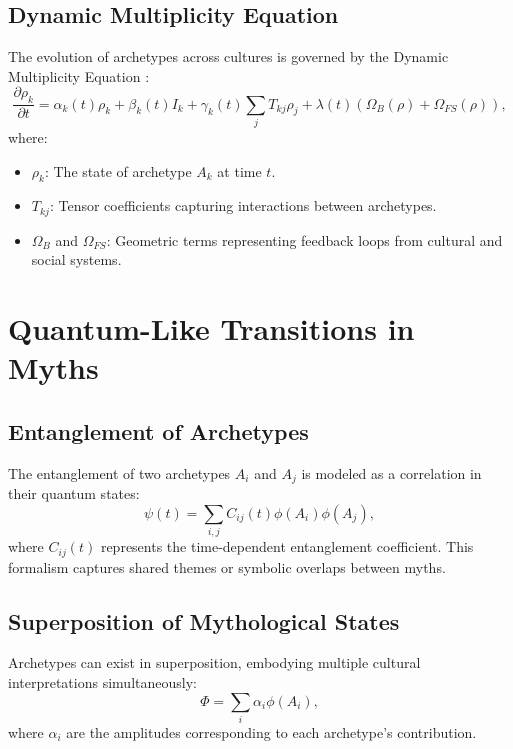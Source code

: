 \documentclass{article}
\theoremstyle{plain}
\begin{document}
\subsection{Dynamic Multiplicity Equation}
The evolution of archetypes across cultures is governed by the Dynamic Multiplicity Equation \cite{galioto2024dynamic}:
\begin{equation}
\frac{\partial \rho_k}{\partial t} = \alpha_k(t)\rho_k + \beta_k(t)I_k + \gamma_k(t) \sum_{j} T_{kj}\rho_j + \lambda(t)\left(\Omega_B(\rho) + \Omega_{FS}(\rho)\right),
\end{equation}
where:
\begin{itemize}
    \item $\rho_k$: The state of archetype $A_k$ at time $t$.
    \item $T_{kj}$: Tensor coefficients capturing interactions between archetypes.
    \item $\Omega_B$ and $\Omega_{FS}$: Geometric terms representing feedback loops from cultural and social systems.
\end{itemize}

\section{Quantum-Like Transitions in Myths}

\subsection{Entanglement of Archetypes}
The entanglement of two archetypes $A_i$ and $A_j$ is modeled as a correlation in their quantum states:
\begin{equation}
\psi(t) = \sum_{i,j} C_{ij}(t) \phi(A_i) \phi(A_j),
\end{equation}
where $C_{ij}(t)$ represents the time-dependent entanglement coefficient. This formalism captures shared themes or symbolic overlaps between myths.

\subsection{Superposition of Mythological States}
Archetypes can exist in superposition, embodying multiple cultural interpretations simultaneously:
\begin{equation}
\Phi = \sum_{i} \alpha_i \phi(A_i),
\end{equation}
where $\alpha_i$ are the amplitudes corresponding to each archetype's contribution.
\end{document}
